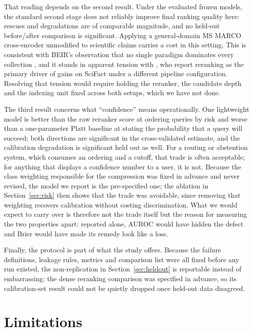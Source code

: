 \documentclass[11pt,a4paper]{article}
\begin{document}
That reading depends on the second result. Under the evaluated frozen models, the standard
second stage does not reliably improve final ranking quality here: rescues and degradations are
of comparable magnitude, and no held-out before/after comparison is significant. Applying a
general-domain MS MARCO cross-encoder unmodified to scientific claims carries a cost in this
setting. This is consistent with BEIR's observation that no single paradigm
dominates every collection \citep{thakur2021beir}, and it stands in apparent tension with
\citet{aljoofi2026multistage}, who report reranking as the primary driver of gains on SciFact
under a different pipeline configuration. Resolving that tension would require holding the
reranker, the candidate depth and the indexing unit fixed across both setups, which we have not
done.

The third result concerns what ``confidence'' means operationally. One lightweight model is
better than the raw reranker score at ordering queries by risk and worse than a one-parameter
Platt baseline at stating the probability that a query will succeed; both directions are
significant in the cross-validated estimate, and the calibration degradation is significant
held out as well. For a routing or abstention system, which consumes an ordering and a cutoff,
that trade is often acceptable; for anything that displays a confidence number to a user, it is
not. Because the class weighting responsible for the compression was fixed in advance and never
revised, the model we report is the pre-specified one; the ablation in Section~\ref{sec:risk}
then shows that the trade was avoidable, since removing that weighting recovers calibration
without costing discrimination. What we would expect to carry over is therefore not the trade
itself but the reason for measuring the two properties apart: reported alone, AUROC would have
hidden the defect and Brier would have made its remedy look like a loss.

Finally, the protocol is part of what the study offers. Because the failure definitions, leakage
rules, metrics and comparison list were all fixed before any run existed, the non-replication in
Section~\ref{sec:heldout} is reportable instead of embarrassing: the dense reranking comparison
was specified in advance, so its calibration-set result could not be quietly dropped once
held-out data disagreed.

\section{Limitations}
\label{sec:limitations}
\end{document}

